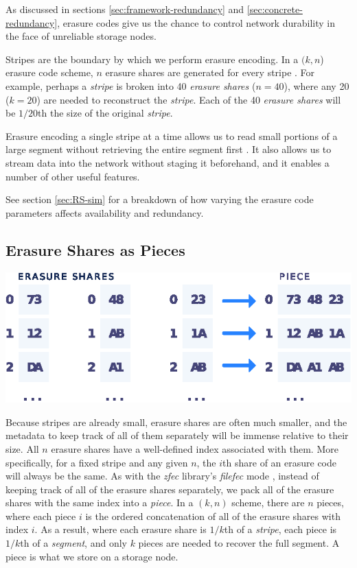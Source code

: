 \documentclass[8pt,fleqn,openany]{book}
\begin{document}
As discussed in sections \ref{sec:framework-redundancy} and
\ref{sec:concrete-redundancy}, erasure codes
give us the chance to control network durability in the face
of unreliable storage nodes.

Stripes are the boundary by which we perform erasure encoding.
In a $(k, n$) erasure code scheme, $n$ erasure shares are generated for
every stripe \cite{rs}.
For example, perhaps a {\em stripe} is broken into 40 {\em erasure shares}
($n=40$), where any 20 ($k=20$) are needed to reconstruct the {\em stripe}. Each
of the 40 {\em erasure shares} will be $1/20$th the size of the original
{\em stripe}.

Erasure encoding
a single stripe at a time allows us to read small portions of a
large segment without retrieving the entire segment first \cite{rs-cd}.
It also allows us to stream data into the
network without staging it beforehand, and it enables a number of other useful
features.

See section \ref{sec:RS-sim} for a breakdown of how varying the erasure code
parameters affects availability and redundancy.

\subsection{Erasure Shares as Pieces}\label{erasure-shares-as-pieces}

\begin{center}
\includegraphics[width=.6\textwidth]{images/share-piece.eps}
\end{center}

Because stripes are already small, erasure shares are often much
smaller, and the metadata to keep track of all of them separately will be
immense relative to their size.
All $n$ erasure shares have a well-defined index associated
with them. More specifically, for
a fixed stripe and any given $n$, the $i$th share of an erasure
code will always be the same.
As with the {\em zfec} library's {\em filefec} mode \cite{filefec-packing},
instead of keeping track of all of the
erasure shares separately, we pack all of the erasure shares with the
same index into a {\em piece}.
In a $(k, n)$ scheme, there are $n$ pieces, where each
piece $i$ is the ordered concatenation of all of the erasure shares with
index $i$. As a result, where each erasure share is $1/k$th of a
{\em stripe}, each piece is $1/k$th of a {\em segment}, and only $k$
pieces are needed to recover the full segment.
A piece is what we store on a storage node.
\end{document}
